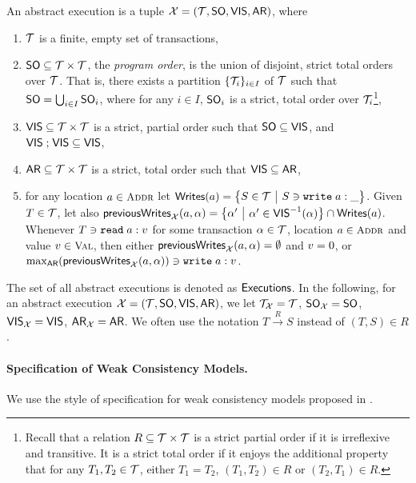 \documentclass[a4paper,UKenglish]{article}%
\theoremstyle{plain}
\begin{document}
\begin{definition}
An abstract execution is a tuple $\mathcal{X} = (\mathcal{T}, {\sf{SO}}, {\mathsf{VIS}}, {\sf{AR}})$, where 

\begin{enumerate}
\item $\mathcal{T}$ is a finite, empty set of transactions, 

\item ${\sf{SO}} \subseteq \mathcal{T} \times \mathcal{T}$, the \emph{program order}, is the union 
of disjoint, strict total orders over $\mathcal{T}$. That is, there exists a partition $\{\mathcal{T}_i\}_{i \in I}$ 
of $\mathcal{T}$ such that ${\sf{SO}} = \bigcup_{i \in I} {\sf{SO}}_i$, where for any $i \in I$, ${\sf{SO}}_i$ is a strict, 
total order over $\mathcal{T}_i$\footnote{Recall that a relation $R \subseteq \mathcal{T} \times \mathcal{T}$ is a strict partial order 
if it is irreflexive and transitive. It is a strict total order if it enjoys the additional property that 
for any $T_1, T_2 \in \mathcal{T}$, either $T_1 = T_2$, $(T_1, T_2) \in R$ or $(T_2, T_1) \in R$.},

\item ${\mathsf{VIS}} \subseteq \mathcal{T} \times \mathcal{T}$ is a strict, partial order such that ${\sf{SO}} \subseteq {\mathsf{VIS}}$, and ${\mathsf{VIS}} \mathrel{;} {\mathsf{VIS}} \subseteq 
{\mathsf{VIS}}$,

\item ${\sf{AR}} \subseteq \mathcal{T} \times \mathcal{T}$ is a strict, total order such that ${\mathsf{VIS}} \subseteq {\sf{AR}}$,

\item for any location $\addr \in \Addr$ let $\WTr(\addr) = \Setcon{S \in \T }{S \ni \WR\;\addr:\anyval }$. 
Given $T \in \mathcal{T}$, let also $\pw_{\aexec}(\addr, \tsid) = \Setcon{\tsid' }{ \tsid' \in \VIS^{-1}(\tsid)} \cap \WTr(\addr)$. 
Whenever $T \ni {{\tt read}}\;a: v$ for some transaction $\alpha \in \mathcal{T}$, location $\addr \in \Addr$ and 
value $\val \in \Val$, then either $\mathsf{previousWrites}_{\mathcal{X}}(a, \alpha) = \emptyset$ and $v = 0$, 
or $\max_{{\sf{AR}}}(\mathsf{previousWrites}_{\mathcal{X}}(a, \alpha)) \ni {{\tt write}}\;a: v$.
\end{enumerate}

\end{definition}
The set of all abstract executions is denoted as ${\mathsf{Executions}}$.
In the following, for an abstract execution $\mathcal{X} = (\mathcal{T}, {\sf{SO}}, {\mathsf{VIS}}, {\sf{AR}})$, we let 
$\mathcal{T}_{\mathcal{X}} = \mathcal{T}$, ${\sf{SO}}_{\mathcal{X}} = {\sf{SO}}$, ${\mathsf{VIS}}_{\mathcal{X}} = {\mathsf{VIS}}$, ${\sf{AR}}_{\mathcal{X}} = {\sf{AR}}$. 
We often use the notation $T \xrightarrow{R} S$ instead of $(T,S) \in R$.

\paragraph{\textbf{Specification of Weak Consistency Models.}}
We use the style of specification for weak consistency models 
proposed in \cite{laws}. 
\end{document}
